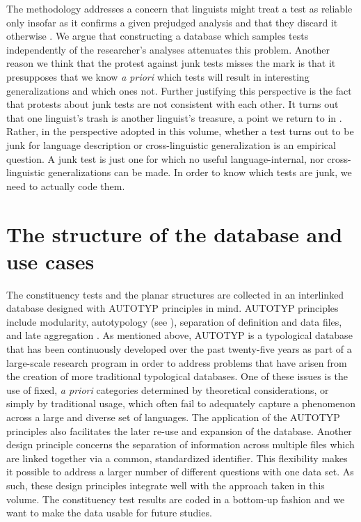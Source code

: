 \documentclass[output=paper,draftmode]{langscibook}
\begin{document}
The methodology addresses a concern that linguists might treat a test as reliable only insofar as it confirms a given prejudged analysis and that they discard it otherwise \citep{croft_radical_2001, croft:tenunwarranted, haspelmathword:2011, tallman2021analysis}. We argue that constructing a database which samples tests independently of the researcher's analyses attenuates this problem. Another reason we think that the protest against junk tests misses the mark is that it presupposes that we know \textit{a priori} which tests will result in interesting generalizations and which ones not. Further justifying this perspective is the fact that protests about junk tests are not consistent with each other. It turns out that one linguist's trash is another linguist's treasure, a point we return to in . Rather, in the perspective adopted in this volume, whether a test turns out to be junk for language description or cross-linguistic generalization is an empirical question. A junk test is just one for which no useful language-internal, nor cross-linguistic generalizations can be made. In order to know which tests are junk, we need to actually code them.

\section{The structure of the database and use cases}

The constituency tests and the planar structures are collected in an interlinked database designed with AUTOTYP principles in mind. AUTOTYP principles include modularity, autotypology (see ), separation of definition and data files, and late aggregation \citep{witzlack2022managing}.
As mentioned above, AUTOTYP is a typological database that has been continuously developed over the past twenty-five years as part of a large-scale research program in order to address problems that have arisen from the creation of more traditional typological databases.
One of these issues is the use of fixed, \textit{a priori} categories determined by theoretical considerations, or simply by traditional usage, which often fail to adequately capture a phenomenon across a large and diverse set of languages. 
The application of the AUTOTYP principles also facilitates the later re-use and expansion of the database.  
Another design principle concerns the separation of information across multiple files which are linked together via a common, standardized identifier. This flexibility makes it possible to address a larger number of different questions with one data set.
As such, these design principles integrate well with the approach taken in this volume. The constituency test results are coded in a bottom-up fashion and we want to make the data usable for future studies. 
\end{document}
